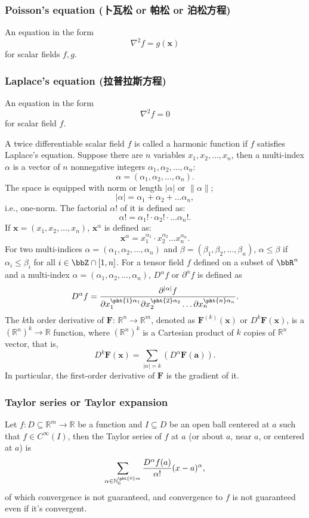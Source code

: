\subsubsection{Poisson's equation (卜瓦松 or 帕松 or 泊松方程)}
An equation in the form
\[\nabla^2 f = g(\mathbf{x})\]
for scalar fields $f,g$.
\subsubsection{Laplace's equation (拉普拉斯方程)}
An equation in the form
\[\nabla^2 f = 0\]
for scalar field $f$.

A twice differentiable scalar field $f$ is called a harmonic function if $f$ satisfies Laplace's equation.
Suppose there are \( n \) variables \( x_1, x_2, \ldots, x_n \), then a multi-index $\alpha$ is a vector of \( n \) nonnegative integers $\alpha_1, \alpha_2,\ldots,\alpha_n$:
\[\alpha = (\alpha_1, \alpha_2,\ldots,\alpha_n).\]
The space is equipped with norm or length $|\alpha|$ or \( \|\alpha\| \);
\[|\alpha| = \alpha_1 + \alpha_2 + \ldots\alpha_n,\]
i.e., one-norm.
The factorial \( \alpha! \) of it is defined as:
\[\alpha! = \alpha_1! \cdot \alpha_2! \cdot \ldots \alpha_n!.\]
If \( \mathbf{x} = (x_1, x_2,\ldots, x_n) \), $\mathbf{x}^\alpha$ is defined as:
\[\mathbf{x}^\alpha = x_1^{\alpha_1} \cdot x_2^{\alpha_2} \ldots  x_n^{\alpha_n}.\]
For two multi-indices $\alpha=(\alpha_1, \alpha_2,\ldots, \alpha_n)$ and $\beta=(\beta_1, \beta_2,\ldots,\beta_n)$, $\alpha\le\beta$ if $\alpha_i\le\beta_i$ for all $i\in\bbZ\cap[1,n]$.
For a tensor field $f$ defined on a subset of $\bbR^n$ and a multi-index $\alpha=(\alpha_1, \alpha_2,\ldots, \alpha_n)$, $D^\alpha f$ or $\partial^\alpha f$ is defined as
\[D^\alpha f = \frac{\partial^{|\alpha|} f}{\partial x_1^{\pht{1}\alpha_1} \partial x_2^{\pht{2}\alpha_2} \ldots  \partial x_n^{\pht{n}\alpha_n}}.\]
The $k$th order derivative of $\mathbf{F}:\,\mathbb{R}^n\to\mathbb{R}^m$, denoted as $\mathbf{F}^{(k)}(\mathbf{x})$ or $D^{k}\mathbf{F}(\mathbf{x})$, is a $(\mathbb{R}^n)^k\to\mathbb{R}$ function, where $(\mathbb{R}^n)^k$ is a Cartesian product of $k$ copies of $\mathbb{R}^n$ vector, that is,
\[D^{k}\mathbf{F}(\mathbf{x})=\sum_{|\alpha|=k} \left(D^\alpha \mathbf{F}(\mathbf{a})\right).\]
In particular, the first-order derivative of $\mathbf{F}$ is the gradient of it.
\subsubsection{Taylor series or Taylor expansion}
Let $f\colon D\subseteq\mathbb{R}^m\to\mathbb{R}$ be a function and $I\subseteq D$ be an open ball centered at $a$ such that $f\in C^{\infty}(I)$, then the Taylor series of $f$ at $a$ (or about $a$, near $a$, or centered at $a$) is
\[\sum_{\alpha\in\mathbb{N}_0^{\pht{0}m}}\frac{D^{\alpha}f(a)}{\alpha !}(x-a)^{\alpha},\]
of which convergence is not guaranteed, and convergence to $f$ is not guaranteed even if it's convergent.

